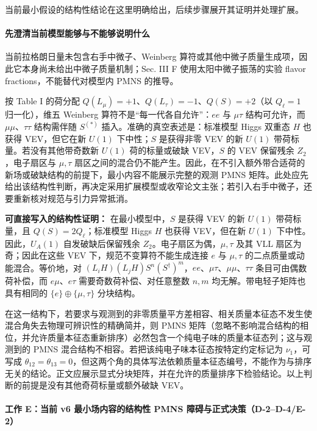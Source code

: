 \documentclass[
  chinese,
  UTF8]{ctexart}
\begin{document}
当前最小假设的结构性结论在这里明确给出，后续步骤展开其证明并处理扩展。

\paragraph{先澄清当前模型能够与不能够说明什么}\label{ux5148ux6f84ux6e05ux5f53ux524dux6a21ux578bux80fdux591fux4e0eux4e0dux80fdux591fux8bf4ux660eux4ec0ux4e48}

当前拉格朗日量未包含右手中微子、Weinberg
算符或其他中微子质量生成项，因此它本身尚未给出中微子质量机制；Sec. III F
使用太阳中微子振荡的实验 flavor fractions，不能替代对模型内 PMNS
的推导。

按 Table I 的荷分配 \(Q(L_\mu)=+1\)、\(Q(L_\tau)=-1\)、\(Q(S)=+2\)（以
\(Q_\ell=1\) 归一化），维五 Weinberg 算符不是``每一代各自允许''：\(ee\)
与 \(\mu\tau\) 结构可允许，而 \(\mu\mu\)、\(\tau\tau\) 结构需伴随
\(S^{(*)}\) 插入。准确的真空表述是：标准模型 Higgs 双重态 \(H\) 也获得
VEV，但它在新 \(U(1)\) 下中性；\(S\) 是获得非零 VEV 的新 \(U(1)\)
带荷标量。若没有其他带奇数新 \(U(1)\) 荷的标量或破缺 VEV，\(S\) 的 VEV
保留残余 \(Z_2\)，电子扇区与 \(\mu,\tau\)
扇区之间的混合仍不能产生。因此，在不引入额外带合适荷的新场或破缺结构的前提下，最小内容不能展示完整的观测
PMNS
矩阵。此处应先给出该结构性判断，再决定采用扩展模型或收窄论文主张；若引入右手中微子，还要重新核对规范与引力异常抵消。

\textbf{可直接写入的结构性证明：} 在最小模型中，\(S\) 是获得 VEV 的新
\(U(1)\) 带荷标量，且 \(Q(S)=2Q_\ell\)；标准模型 Higgs \(H\) 也获得
VEV，但在新 \(U(1)\) 下中性。因此，\(U_A(1)\) 自发破缺后保留残余
\(Z_2\)。电子扇区为偶，\(\mu,\tau\) 及其 VLL 扇区为奇；因此在这些 VEV
下，规范不变算符不能生成连接 \(e\) 与 \(\mu,\tau\)
的二点质量或动能混合。等价地，对
\((L_iH)(L_jH)S^n(S^\dagger)^m\)，\(ee\)、\(\mu\tau\)、\(\mu\mu\)、\(\tau\tau\)
条目可由偶数荷补偿，而 \(e\mu\)、\(e\tau\) 需要奇数荷补偿、对任意整数
\(n,m\) 均无解。带电轻子矩阵也具有相同的 \(\{e\}\oplus\{\mu,\tau\}\)
分块结构。

在这一结构下，若要求与观测到的非零质量平方差相容、相关质量本征态不发生使混合角失去物理可辨识性的精确简并，则
PMNS
矩阵（忽略不影响混合结构的相位，并允许质量本征态重新排序）必然包含一个纯电子味的质量本征态列；这与观测到的
PMNS 混合结构不相容。若把该纯电子味本征态按特定约定标记为
\(\nu_1\)，可写成
\(\theta_{12}=\theta_{13}=0\)，但这两个角的具体写法依赖质量本征态编号，不能作为与排序无关的结论。正文应展示显式分块矩阵，并在允许的质量排序下检验结论。以上判断的前提是没有其他奇荷标量或额外破缺
VEV。

\paragraph{工作 E：当前 v6 最小场内容的结构性 PMNS
障碍与正式决策（D-2--D-4/E-2）}\label{ux5de5ux4f5c-eux5f53ux524d-v6-ux6700ux5c0fux573aux5185ux5bb9ux7684ux7ed3ux6784ux6027-pmns-ux969cux788dux4e0eux6b63ux5f0fux51b3ux7b56d-2d-4e-2}
\end{document}
